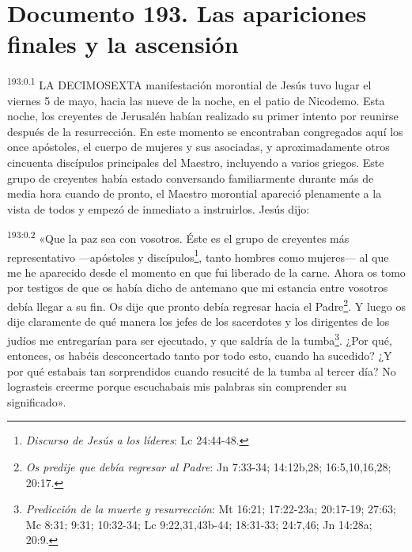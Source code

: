 \chapter{Documento 193. Las apariciones finales y la ascensión}
\par
\textsuperscript{193:0.1} LA DECIMOSEXTA manifestación morontial de Jesús tuvo lugar el viernes 5 de mayo, hacia las nueve de la noche, en el patio de Nicodemo. Esta noche, los creyentes de Jerusalén habían realizado su primer intento por reunirse después de la resurrección. En este momento se encontraban congregados aquí los once apóstoles, el cuerpo de mujeres y sus asociadas, y aproximadamente otros cincuenta discípulos principales del Maestro, incluyendo a varios griegos. Este grupo de creyentes había estado conversando familiarmente durante más de media hora cuando de pronto, el Maestro morontial apareció plenamente a la vista de todos y empezó de inmediato a instruirlos. Jesús dijo:

\par
\textsuperscript{193:0.2} «Que la paz sea con vosotros. Éste es el grupo de creyentes más representativo ---apóstoles y discípulos\footnote{\textit{Discurso de Jesús a los líderes}: Lc 24:44-48.}, tanto hombres como mujeres--- al que me he aparecido desde el momento en que fui liberado de la carne. Ahora os tomo por testigos de que os había dicho de antemano que mi estancia entre vosotros debía llegar a su fin. Os dije que pronto debía regresar hacia el Padre\footnote{\textit{Os predije que debía regresar al Padre}: Jn 7:33-34; 14:12b,28; 16:5,10,16,28; 20:17.}. Y luego os dije claramente de qué manera los jefes de los sacerdotes y los dirigentes de los judíos me entregarían para ser ejecutado, y que saldría de la tumba\footnote{\textit{Predicción de la muerte y resurrección}: Mt 16:21; 17:22-23a; 20:17-19; 27:63; Mc 8:31; 9:31; 10:32-34; Lc 9:22,31,43b-44; 18:31-33; 24:7,46; Jn 14:28a; 20:9.}. ¿Por qué, entonces, os habéis desconcertado tanto por todo esto, cuando ha sucedido? ¿Y por qué estabais tan sorprendidos cuando resucité de la tumba al tercer día? No lograsteis creerme porque escuchabais mis palabras sin comprender su significado».

